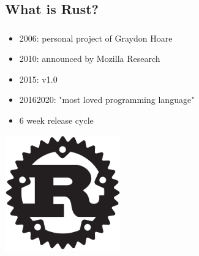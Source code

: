 \documentclass[aspectratio=43, t]{beamer}
\begin{document}
\subsection*{What is Rust?}
\begin{frame}
	\frametitle{\subsecname}

	\begin{itemize}
		\item 2006: personal project of Graydon Hoare
		\item 2010: announced by Mozilla Research
		\item 2015: v1.0
		\item 2016\textendash{}2020: "most loved programming language"
		\item 6 week release cycle
	\end{itemize}

	\vspace{0pt plus 1filll}

	\begin{flushright}
		\includegraphics[width = 5cm, height = 5cm, keepaspectratio]{rust-logo-512x512-blk}
	\end{flushright}

	\vspace*{1cm}
\end{frame}
\end{document}

